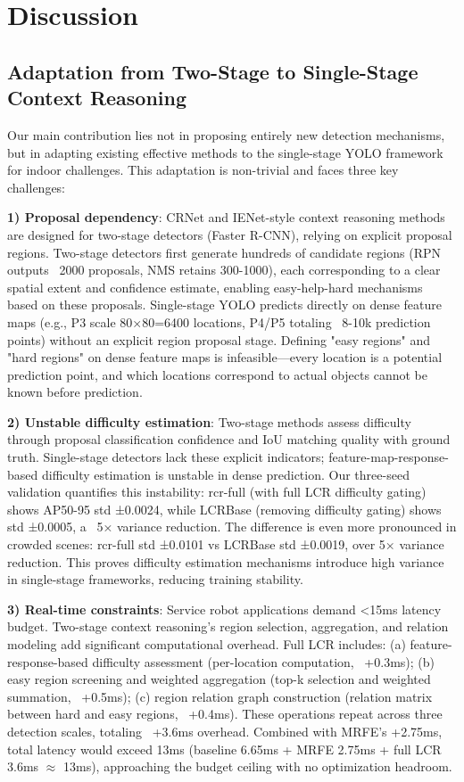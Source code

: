 \documentclass[journal]{IEEEtran}
\begin{document}
\section{Discussion}
\label{sec:discussion}

\subsection{Adaptation from Two-Stage to Single-Stage Context Reasoning}

Our main contribution lies not in proposing entirely new detection mechanisms, but in adapting existing effective methods to the single-stage YOLO framework for indoor challenges. This adaptation is non-trivial and faces three key challenges:

\textbf{1) Proposal dependency}: CRNet and IENet-style context reasoning methods are designed for two-stage detectors (Faster R-CNN), relying on explicit proposal regions. Two-stage detectors first generate hundreds of candidate regions (RPN outputs ~2000 proposals, NMS retains 300-1000), each corresponding to a clear spatial extent and confidence estimate, enabling easy-help-hard mechanisms based on these proposals. Single-stage YOLO predicts directly on dense feature maps (e.g., P3 scale 80×80=6400 locations, P4/P5 totaling ~8-10k prediction points) without an explicit region proposal stage. Defining "easy regions" and "hard regions" on dense feature maps is infeasible—every location is a potential prediction point, and which locations correspond to actual objects cannot be known before prediction.

\textbf{2) Unstable difficulty estimation}: Two-stage methods assess difficulty through proposal classification confidence and IoU matching quality with ground truth. Single-stage detectors lack these explicit indicators; feature-map-response-based difficulty estimation is unstable in dense prediction. Our three-seed validation quantifies this instability: rcr-full (with full LCR difficulty gating) shows AP50-95 std ±0.0024, while LCRBase (removing difficulty gating) shows std ±0.0005, a ~5× variance reduction. The difference is even more pronounced in crowded scenes: rcr-full std ±0.0101 vs LCRBase std ±0.0019, over 5× variance reduction. This proves difficulty estimation mechanisms introduce high variance in single-stage frameworks, reducing training stability.

\textbf{3) Real-time constraints}: Service robot applications demand <15ms latency budget. Two-stage context reasoning's region selection, aggregation, and relation modeling add significant computational overhead. Full LCR includes: (a) feature-response-based difficulty assessment (per-location computation, ~+0.3ms); (b) easy region screening and weighted aggregation (top-k selection and weighted summation, ~+0.5ms); (c) region relation graph construction (relation matrix between hard and easy regions, ~+0.4ms). These operations repeat across three detection scales, totaling ~+3.6ms overhead. Combined with MRFE's +2.75ms, total latency would exceed 13ms (baseline 6.65ms + MRFE 2.75ms + full LCR 3.6ms $\approx$ 13ms), approaching the budget ceiling with no optimization headroom.
\end{document}
